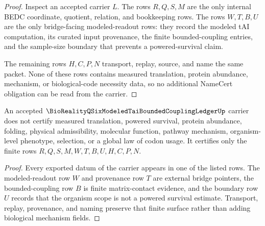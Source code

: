 \begin{proof}
Inspect an accepted carrier $L$. The rows $R,Q,S,M$ are the only internal BEDC coordinate, quotient, relation, and bookkeeping rows. The rows $W,T,B,U$ are the only bridge-facing modeled-readout rows: they record the modeled tAI computation, its curated input provenance, the finite bounded-coupling entries, and the sample-size boundary that prevents a powered-survival claim.

The remaining rows $H,C,P,N$ transport, replay, source, and name the same packet. None of these rows contains measured translation, protein abundance, mechanism, or biological-code necessity data, so no additional NameCert obligation can be read from the carrier.
\end{proof}

\begin{theorem}
\label{thm:bioreality-q-six-modeled-tai-bounded-coupling-ledger-nonescape}
An accepted $\BioRealityQSixModeledTaiBoundedCouplingLedgerUp$ carrier does not certify measured translation, powered survival, protein abundance, folding, physical admissibility, molecular function, pathway mechanism, organism-level phenotype, selection, or a global law of codon usage. It certifies only the finite rows $R,Q,S,M,W,T,B,U,H,C,P,N$.
\end{theorem}

\begin{proof}
Every exported datum of the carrier appears in one of the listed rows. The modeled-readout row $W$ and provenance row $T$ are external bridge pointers, the bounded-coupling row $B$ is finite matrix-contact evidence, and the boundary row $U$ records that the organism scope is not a powered survival estimate. Transport, replay, provenance, and naming preserve that finite surface rather than adding biological mechanism fields.
\end{proof}



